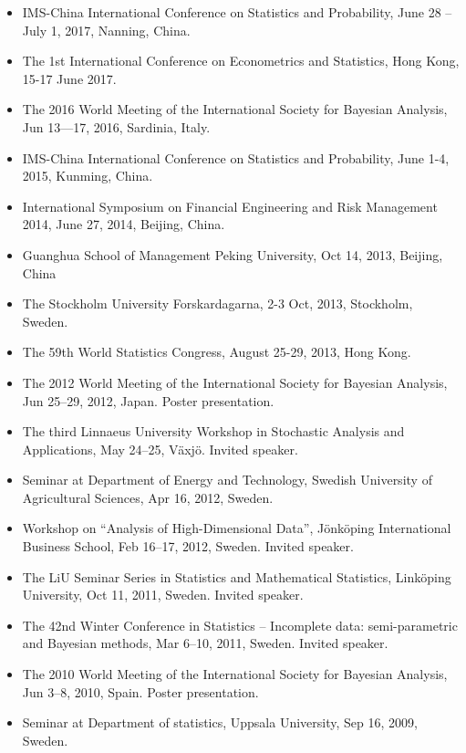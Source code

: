 \documentclass[twoside,a4paper]{article}
\begin{document}
\begin{itemize}
\item IMS-China International Conference on Statistics and Probability, June 28 – July 1, 2017, Nanning, China.

\item The 1st International Conference on Econometrics and Statistics, Hong Kong, 15-17 June 2017.

\item The 2016 World Meeting of the International Society for Bayesian Analysis, Jun 13—17, 2016, Sardinia, Italy.

\item IMS-China International Conference on Statistics and Probability, June 1-4, 2015, Kunming, China.

\item International Symposium on Financial Engineering and Risk Management 2014, June 27, 2014, Beijing, China.

\item Guanghua School of Management Peking University, Oct 14, 2013, Beijing, China

\item The Stockholm University Forskardagarna, 2-3 Oct, 2013, Stockholm, Sweden.

\item The 59th World Statistics Congress, August 25-29, 2013, Hong Kong.

\item The 2012 World Meeting of the International Society for Bayesian Analysis, Jun 25--29, 2012, Japan. Poster presentation.

\item The third Linnaeus University Workshop in Stochastic Analysis and Applications, May 24--25, Växjö. Invited speaker.

\item Seminar at Department of Energy and Technology, Swedish University of Agricultural Sciences, Apr 16, 2012, Sweden.

\item Workshop on ``Analysis of High-Dimensional Data'', Jönköping International Business School, Feb 16--17, 2012, Sweden. Invited speaker.

\item The LiU Seminar Series in Statistics and Mathematical Statistics, Linköping University, Oct 11, 2011, Sweden. Invited speaker.

\item The 42nd Winter Conference in Statistics -- Incomplete data: semi-parametric and Bayesian methods, Mar 6--10, 2011, Sweden. Invited speaker.

\item The 2010 World Meeting of the International Society for Bayesian Analysis, Jun 3--8, 2010, Spain. Poster presentation.

\item Seminar at Department of statistics, Uppsala University, Sep 16, 2009, Sweden.

\end{itemize}
\end{document}
